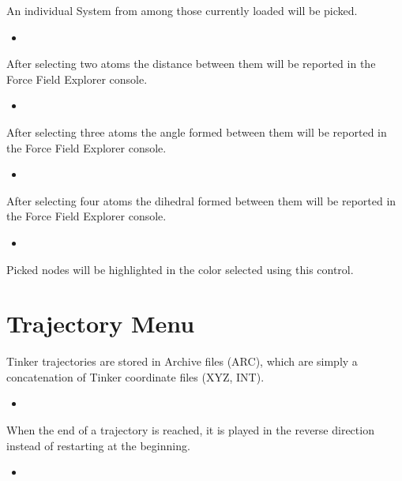 \documentclass[letterpaper,11pt,english]{sphinxmanual}
\begin{document}
An individual System from among those currently loaded will be picked.
\begin{itemize}
\item {} 

\end{itemize}

After selecting two atoms the distance between them will be reported in the Force Field Explorer console.
\begin{itemize}
\item {} 

\end{itemize}

After selecting three atoms the angle formed between them will be reported in the Force Field Explorer console.
\begin{itemize}
\item {} 

\end{itemize}

After selecting four atoms the dihedral formed between them will be reported in the Force Field Explorer console.
\begin{itemize}
\item {} 

\end{itemize}

Picked nodes will be highlighted in the color selected using this control.


\section{Trajectory Menu}
\label{\detokenize{text/menus:trajectory-menu}}
Tinker trajectories are stored in Archive files (ARC), which are simply a concatenation of Tinker coordinate files (XYZ, INT).
\begin{itemize}
\item {} 

\end{itemize}

When the end of a trajectory is reached, it is played in the reverse direction instead of restarting at the beginning.
\begin{itemize}
\item {} 

\end{itemize}
\end{document}
